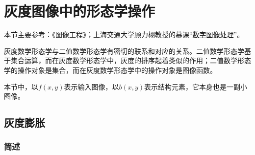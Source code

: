 \documentclass[UTF8]{ctexart}
\begin{document}
		

    \section{灰度图像中的形态学操作}\label{grayscale}
        
        \indent 本节主要参考：《图像工程》\cite{zhang2005图像工程}；上海交通大学顾力栩教授的慕课“\href{https://www.icourse163.org/course/0809SJTU012-1003381021}{数字图像处理}”。
        
        \indent 灰度数学形态学与二值数学形态学有密切的联系和对应的关系。二值数学形态学基于集合运算，而在灰度数学形态学中，灰度的排序起着类似的作用；二值数学形态学的操作对象是集合，而在灰度数学形态学中的操作对象是图像函数。
        
        \indent 本节中，以$f\left( x, y \right)$表示输入图像，以$b\left( x, y \right)$表示结构元素，它本身也是一副小图像。
        
        \subsection{灰度膨胀}
            
            \subsubsection{简述}
\end{document}
